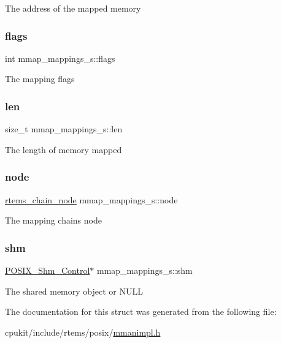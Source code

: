 The address of the mapped memory \mbox{\label{structmmap__mappings__s_a95c4a8ce4546f0e092af8b29add270d8}} 
\subsubsection{\texorpdfstring{flags}{flags}}
{\footnotesize\ttfamily int mmap\+\_\+mappings\+\_\+s\+::flags}

The mapping flags \mbox{\label{structmmap__mappings__s_a40212b333812a712df0ed2f9d69e069f}} 
\subsubsection{\texorpdfstring{len}{len}}
{\footnotesize\ttfamily size\+\_\+t mmap\+\_\+mappings\+\_\+s\+::len}

The length of memory mapped \mbox{\label{structmmap__mappings__s_a94954468f896c782bbb37d9dfebbc08b}} 
\subsubsection{\texorpdfstring{node}{node}}
{\footnotesize\ttfamily \mbox{\hyperlink{structChain__Node__struct}{rtems\+\_\+chain\+\_\+node}} mmap\+\_\+mappings\+\_\+s\+::node}

The mapping chain\textquotesingle{}s node \mbox{\label{structmmap__mappings__s_a625df943b7873351709b8cee15a9c6bd}} 
\subsubsection{\texorpdfstring{shm}{shm}}
{\footnotesize\ttfamily \mbox{\hyperlink{structPOSIX__Shm__Control}{P\+O\+S\+I\+X\+\_\+\+Shm\+\_\+\+Control}}$\ast$ mmap\+\_\+mappings\+\_\+s\+::shm}

The shared memory object or N\+U\+LL 

The documentation for this struct was generated from the following file\+:\begin{DoxyCompactItemize}
\item 
cpukit/include/rtems/posix/\mbox{\hyperlink{mmanimpl_8h}{mmanimpl.\+h}}\end{DoxyCompactItemize}
